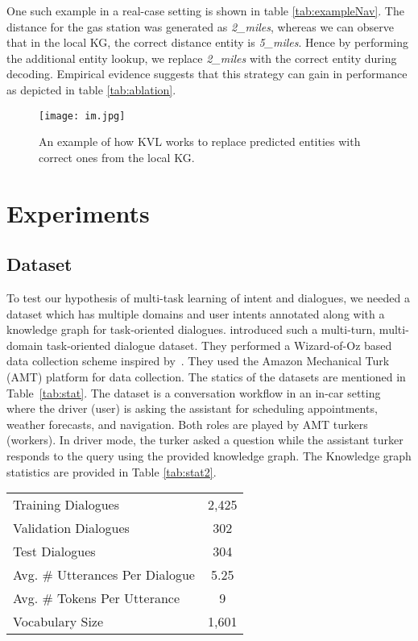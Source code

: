 \documentclass[runningheads]{llncs}
\begin{document}
One such example in a real-case setting is shown in table \ref{tab:exampleNav}. The distance for the gas station was generated as \textit{2\_miles}, whereas we can observe that in the local KG, the correct distance entity is \textit{5\_miles}. Hence by performing the additional entity lookup, we replace \textit{2\_miles} with the correct entity during decoding. Empirical evidence suggests that this strategy can gain in performance as depicted in table \ref{tab:ablation}.

\begin{figure}
    \centering
    \texttt{[image: im.jpg]}
    \vspace{-0.5cm}
    \caption{An example of how KVL works to replace predicted entities with correct ones from the local KG.}
    \label{fig:KVl}
\end{figure}

\section{Experiments}
\subsection{Dataset}
To test our hypothesis of multi-task learning of intent and dialogues, we needed a dataset which has multiple domains and user intents annotated along with a knowledge graph for task-oriented dialogues. \cite{eric-manning:2017:SIGDIAL} introduced such a multi-turn, multi-domain task-oriented dialogue dataset. They performed a Wizard-of-Oz based data collection scheme inspired by~\cite{wen2016network}. They used the Amazon Mechanical Turk (AMT) platform for data collection. The statics of the datasets are mentioned in Table~\ref{tab:stat}. The dataset is a conversation workflow in an in-car setting where the driver (user) is asking the assistant for scheduling appointments, weather forecasts, and navigation. Both roles are played by AMT turkers (workers). In driver mode, the turker asked a question while the assistant turker responds to the query using the provided knowledge graph. The Knowledge graph statistics are provided in Table \ref{tab:stat2}. \begin{table*}[ht]
    \caption{Statistics of the in-car multi-turn, multi-domain, goal-oriented dialogue dataset.}
    \centering  
     \begin{tabular}{ l | c}
     \toprule
     Training Dialogues & 2,425\\
     Validation Dialogues &	302\\
     Test Dialogues	& 304 \\
     Avg. \# Utterances Per Dialogue &	5.25 \\
     Avg. \# Tokens Per Utterance &	9 \\
     Vocabulary Size &	1,601 \\
     \bottomrule
    \end{tabular}
    \vspace{0.1cm}
    
    \label{tab:stat}
\end{table*}
\end{document}
